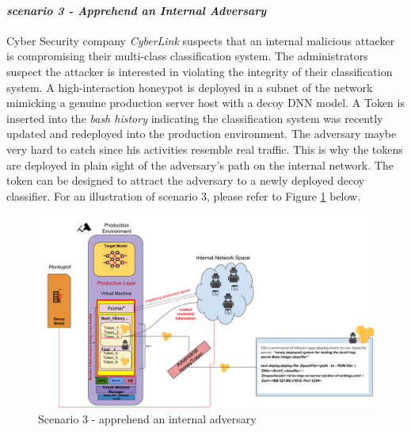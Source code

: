 \documentclass[grad,lot,lof,11pt,oneside,onehalfspace]{RUthesis}
\begin{document}
\paragraph{\textit{scenario 3 - Apprehend an Internal Adversary}}
Cyber Security company \textit{CyberLink} suspects that an internal malicious attacker is compromising their multi-class classification system. The administrators suspect the attacker is interested in violating the integrity of their classification system. A high-interaction honeypot is deployed in a subnet of the network mimicking a genuine production server host with a decoy DNN model. A Token is inserted into the \textit{bash history} indicating the classification system was recently updated and redeployed into the production environment. The adversary maybe very hard to catch since his activities resemble real traffic. This is why the tokens are deployed in plain sight of the adversary's path on the internal network. The token can be designed to attract the adversary to a newly deployed decoy classifier. For an illustration of scenario 3, please refer to Figure \ref*{fig:Scenario3} below.
\begin{figure}[tbh!]
    \centering
\includegraphics[width=0.7\linewidth]{"Images/Chapter 5/Scenario3"}
\caption{Scenario 3 - apprehend an internal adversary}
\label{fig:Scenario3}
\end{figure}
\end{document}

